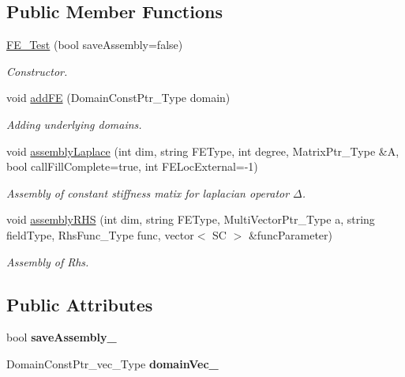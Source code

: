\subsection*{Public Member Functions}
\begin{DoxyCompactItemize}
\item 
\mbox{\label{classFEDD_1_1FE__Test_a2e9a8640f2f6ed99376efbe84298e744}} 
\hyperlink{classFEDD_1_1FE__Test_a2e9a8640f2f6ed99376efbe84298e744}{F\+E\+\_\+\+Test} (bool save\+Assembly=false)
\begin{DoxyCompactList}\small\item\em Constructor. \end{DoxyCompactList}\item 
void \hyperlink{classFEDD_1_1FE__Test_a9703f9144722f9c01e5bde489c2e6c2f}{add\+FE} (Domain\+Const\+Ptr\+\_\+\+Type domain)
\begin{DoxyCompactList}\small\item\em Adding underlying domains. \end{DoxyCompactList}\item 
void \hyperlink{classFEDD_1_1FE__Test_a1680db21378d38bdf239d64961497cb0}{assembly\+Laplace} (int dim, string F\+E\+Type, int degree, Matrix\+Ptr\+\_\+\+Type \&A, bool call\+Fill\+Complete=true, int F\+E\+Loc\+External=-\/1)
\begin{DoxyCompactList}\small\item\em Assembly of constant stiffness matix for laplacian operator $ \Delta $. \end{DoxyCompactList}\item 
void \hyperlink{classFEDD_1_1FE__Test_a262c614022e1bf4bf44cafb282494d15}{assembly\+R\+HS} (int dim, string F\+E\+Type, Multi\+Vector\+Ptr\+\_\+\+Type a, string field\+Type, Rhs\+Func\+\_\+\+Type func, vector$<$ SC $>$ \&func\+Parameter)
\begin{DoxyCompactList}\small\item\em Assembly of Rhs. \end{DoxyCompactList}\end{DoxyCompactItemize}
\subsection*{Public Attributes}
\begin{DoxyCompactItemize}
\item 
\mbox{\label{classFEDD_1_1FE__Test_a9d4fe8878ab5ce8bf7817b2b7f57b1fc}} 
bool {\bfseries save\+Assembly\+\_\+}
\item 
\mbox{\label{classFEDD_1_1FE__Test_ad429d8e769350d7ab954942729d77674}} 
Domain\+Const\+Ptr\+\_\+vec\+\_\+\+Type {\bfseries domain\+Vec\+\_\+}
\end{DoxyCompactItemize}


